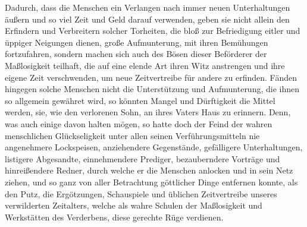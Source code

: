 Dadurch, dass die Menschen ein Verlangen nach immer neuen Unterhaltungen äußern
und so viel Zeit und Geld darauf verwenden, geben sie nicht allein den Erfindern
und Verbreitern solcher Torheiten, die bloß zur Befriedigung eitler und üppiger
Neigungen dienen, große Aufmunterung, mit ihren Bemühungen fortzufahren, sondern
machen sich auch des Bösen dieser Beförderer der
Maßlosigkeit
teilhaft, die auf
eine elende Art ihren Witz anstrengen und ihre eigene Zeit verschwenden, um neue
Zeitvertreibe für andere zu erfinden. Fänden hingegen solche Menschen nicht die
Unterstützung und Aufmunterung, die ihnen so allgemein gewähret wird, so könnten
Mangel und Dürftigkeit die Mittel werden, sie, wie den verlorenen Sohn, an ihres
Vaters Haus zu erinnern. Denn, was auch einige davon halten mögen, so hatte doch
der Feind der wahren menschlichen Glückseligkeit unter
allen seinen
Verführungsmitteln nie angenehmere Lockspeisen, anziehendere Gegenstände,
gefälligere Unterhaltungen, listigere Abgesandte, einnehmendere
Prediger,
bezauberndere Vorträge und hinreißendere Redner, durch welche er die Menschen
anlocken und in sein Netz ziehen, und so ganz von aller Betrachtung göttlicher
Dinge entfernen konnte, als den Putz, die Ergötzungen, Schauspiele und üblichen
Zeitvertreibe unseres verwilderten Zeitalters, welche als wahre Schulen der
Maßlosigkeit und
Werkstätten des
Verderbens, diese gerechte Rüge verdienen.







